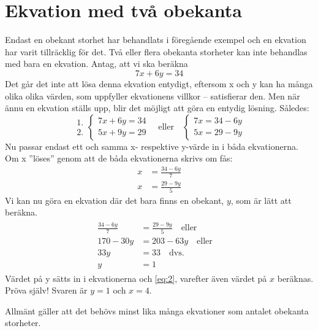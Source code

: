 \section{Ekvation med två obekanta}

Endast en obekant storhet har behandlats i föregående exempel och en ekvation
har varit tillräcklig för det.
Två eller flera obekanta storheter kan inte behandlas med bara en ekvation.
Antag, att vi ska beräkna
\[7x+6y=34\]
Det går det inte att lösa denna ekvation entydigt, eftersom x och y kan ha många
olika olika värden, som uppfyller ekvationens villkor -- satisfierar den.
Men när ännu en ekvation ställs upp, blir det möjligt att göra en entydig
lösning.
Således:
\[
\begin{array}{c}
1.\\2.
\end{array}
\left\{
\begin{array}{l}
7x + 6y = 34\\
5x + 9y = 29
\end{array}
\right.
\quad \text{eller} \quad
\left\{
\begin{array}{l}
7x = 34 - 6y\\
5x = 29 - 9y 
\end{array}
\right. 
\]
Nu passar endast ett och samma x- respektive y-värde in i båda ekvationerna.
Om x ''löses'' genom att de båda ekvationerna skrivs om fås:
\begin{align}
  \label{eq:1}
  x &= \frac{34-6y}{7}\\
  \label{eq:2}
  x &= \frac{29-9y}{5}
\end{align}
Vi kan nu göra en ekvation  där det bara finns en obekant, \(y\),
som är lätt att beräkna.
\begin{align}
  \begin{split}
    \label{eq:3}
    \frac{34 - 6y}{7} &= \frac{29 - 9y}{5}
    \quad \text{eller} \\
    170 - 30y &= 203-63y
    \quad \text{eller} \quad \\
    33y &= 33
    \quad \text{dvs.} \quad \\
    y &= 1
  \end{split}
\end{align}
Värdet på y sätts in i ekvationerna  och \ref{eq:2}, varefter även
värdet på \(x\) beräknas.
Pröva själv! Svaren är \(y = 1\) och \(x = 4\).

Allmänt gäller att det behövs minst lika många ekvationer som antalet obekanta
storheter.

